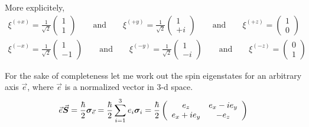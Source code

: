 \documentclass[11pt,a4paper]{report}
\begin{document}
More explicitely, 
\begin{eqnarray}
\xi^{(+ x)}=\frac{1}{\sqrt{2}}\left(\begin{array}{r}1\\1\end{array}\right)
\qquad\text{and}\qquad
\xi^{(+ y)}=\frac{1}{\sqrt{2}}\left(\begin{array}{r}1\\+ i\end{array}\right)
\qquad\text{and}\qquad
\xi^{(+ z)}=\left(\begin{array}{c}1\\0\end{array}\right)
\nonumber\\
\xi^{(- x)}=\frac{1}{\sqrt{2}}\left(\begin{array}{r}1\\-1\end{array}\right)
\qquad\text{and}\qquad
\xi^{(- y)}=\frac{1}{\sqrt{2}}\left(\begin{array}{r}1\\- i\end{array}\right)
\qquad\text{and}\qquad
\xi^{(- z)}=\left(\begin{array}{c}0\\1\end{array}\right)
\end{eqnarray}

For the sake of completeness let me work out the spin eigenstates for
an arbitrary axis $\vec{e}$, where $\vec{e}$ is a normalized vector in
3-d space.
\begin{eqnarray}
\vec{e}\vec{\bm{S}}
=\frac{\hbar}{2}\bm{\sigma}_{\vec{e}}
=\frac{\hbar}{2}\sum_{i=1}^3 e_i\bm{\sigma}_i
=\frac{\hbar}{2}
\left(\begin{array}{cc}e_z &e_x-ie_y\\e_x+ie_y&-e_z\end{array}\right)
\end{eqnarray}
\end{document}
